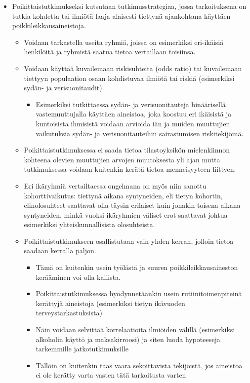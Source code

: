 \documentclass[
]{book}
\providecommand{\tightlist}{%
  \setlength{\itemsep}{0pt}\setlength{\parskip}{0pt}}
\begin{document}
\begin{itemize}
\tightlist
\item
  Poikittaistutkimukseksi kutsutaan tutkimusstrategiaa, jossa tarkoituksena on tutkia kohdetta tai ilmiötä laaja-alaisesti tiettynä ajankohtana käyttäen poikkileikkausaineistoja.

  \begin{itemize}
  \tightlist
  \item
    Voidaan tarkastella useita ryhmiä, joissa on esimerkiksi eri-ikäisiä henkilöitä ja ryhmistä saatua tietoa vertaillaan toisiinsa.
  \item
    Voidaan käyttää kuvailemaan riskisuhteita (odds ratio) tai kuvailemaan tiettyyn populaation osaan kohdistuvaa ilmiötä tai riskiä (esimerkiksi sydän- ja verisuonitaudit).

    \begin{itemize}
    \tightlist
    \item
      Esimerkiksi tutkittaessa sydän- ja verisuonitauteja binäärisellä vastemuuttujalla käyttäen aineistoa, joka koostuu eri ikäisistä ja kuntoisista ihmisistä voidaan arvioida iän ja muiden muuttujien vaikutuksia sydän- ja verisuonitauteihin sairastumisen riskitekijöinä.
    \end{itemize}
  \item
    Poikittaistutkimuksessa ei saada tietoa tilastoyksikön mielenkiinnon kohteena olevien muuttujien arvojen muutoksesta yli ajan mutta tutkimuksessa voidaan kuitenkin kerätä tietoa menneisyyteen liittyen.
  \item
    Eri ikäryhmiä vertailtaessa ongelmana on myös niin sanottu kohorttivaikutus: tiettynä aikana syntyneiden, eli tietyn kohortin, elinolosuhteet saattavat olla täysin erilaiset kuin jonakin toisena aikana syntyneiden, minkä vuoksi ikäryhmien väliset erot saattavat johtua esimerkiksi yhteiskunnallisista olosuhteista.
  \item
    Poikittaistutkimukseen osallistutaan vain yhden kerran, jolloin tietoa saadaan kerralla paljon.

    \begin{itemize}
    \tightlist
    \item
      Tämä on kuitenkin usein työlästä ja suuren poikkileikkausaineston kerääminen voi olla kallista.
    \item
      Poikittaistutkimuksessa hyödynnetäänkin usein rutiinitoimenpiteinä kerättyjä aineistoja (esimerkiksi tietyn ikävuoden terveystarkastuksista)
    \item
      Näin voidaan selvittää korrelaatioita ilmiöiden välillä (esimerkiksi alkoholin käyttö ja maksakirroosi) ja siten luoda hypoteeseja tarkemmille jatkotutkimuksille
    \item
      Tällöin on kuitenkin taas vaara sekoittavista tekijöistä, jos aineistoa ei ole kerätty varta vasten tätä tarkoitusta varten
    \end{itemize}
  \end{itemize}
\end{itemize}
\end{document}

